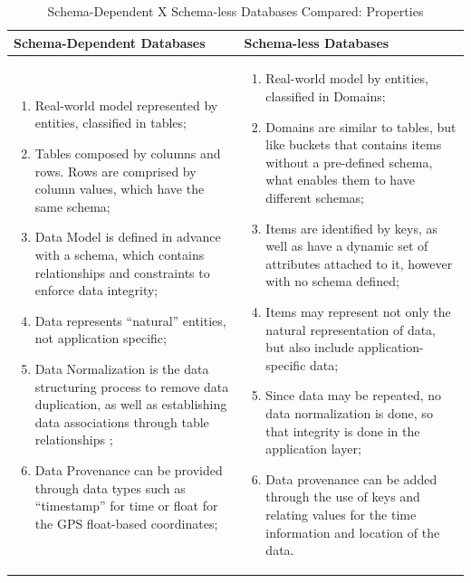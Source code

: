 \begin{table}
    \label{tab:schema-vs-schemaless}
    \caption{Schema-Dependent X Schema-less Databases Compared: Properties}
    \begin{center}
    \begin{tabular}{|p{210pt}|p{210pt}|}\hline
    Schema-Dependent Databases & Schema-less Databases\\\hline
    \begin{enumerate}
      \item Real-world model represented by entities, classified in tables;
      \item Tables composed by columns and rows. Rows are comprised by column
      values, which have the same schema;
      \item Data Model is defined in advance with a schema, which contains
      relationships and constraints to enforce data integrity;
      \item Data represents ``natural'' entities, not application specific;
      \item Data Normalization is the data structuring process to remove data
      duplication, as well as establishing data associations through table
      relationships \cite{db-normalization};
      \item Data Provenance can be provided through data types such as
      ``timestamp'' for time or float for the GPS float-based coordinates; 
    \end{enumerate} 
    & 
    \begin{enumerate}
      \item Real-world model by entities, classified in Domains;
      \item Domains are similar to tables, but like buckets that contains items
      without a pre-defined schema, what enables them to have different schemas;
      \item Items are identified by keys, as well as have a dynamic set of
      attributes attached to it, however with no schema defined;
      \item Items may represent not only the natural representation of data, but
      also include application-specific data;
      \item Since data may be repeated, no data normalization is done, so that
      integrity is done in the application layer;
      \item Data provenance can be added through the use of keys and relating
      values for the time information and location of the data.
    \end{enumerate}
    \\\hline
    \end{tabular}
    \end{center}
\end{table}


